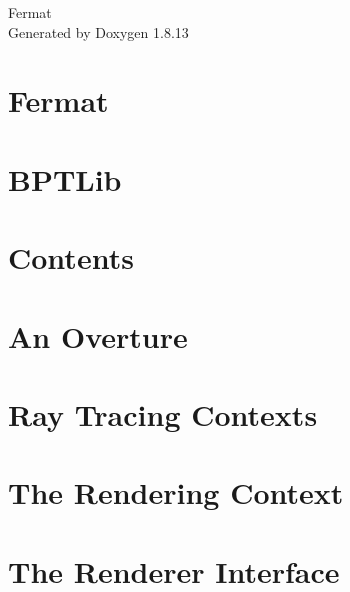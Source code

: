 \documentclass[twoside]{book}
\newcommand{\+}{\discretionary{\mbox{\scriptsize$\hookleftarrow$}}{}{}}
\newcommand{\clearemptydoublepage}{%
  \newpage{\pagestyle{empty}\cleardoublepage}%
}
\begin{document}
\hypersetup{pageanchor=false,
             bookmarksnumbered=true,
             pdfencoding=unicode
            }
\begin{titlepage}
\vspace*{7cm}
\begin{center}%
{\Large Fermat }\\
\vspace*{1cm}
{\large Generated by Doxygen 1.8.13}\\
\end{center}
\end{titlepage}
\clearemptydoublepage
{}
\tableofcontents
\clearemptydoublepage
{}
\hypersetup{pageanchor=true}

\chapter{Fermat}
\label{index}\hypertarget{index}{}
\chapter{B\+P\+T\+Lib}
\label{_b_p_t_lib_page}

\chapter{Contents}
\label{_overture_contents_page}

\chapter{An Overture}
\label{_overture_page}

\chapter{Ray Tracing Contexts}
\label{_r_t_context_page}

\chapter{The Rendering Context}
\label{_rendering_context_page}

\chapter{The Renderer Interface}
\label{_renderer_interface_page}

\end{document}
